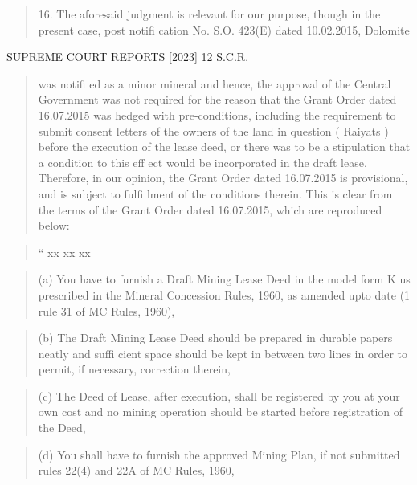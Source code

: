 \documentclass[12pt,a4paper]{article}
\newenvironment{judgequote}
  {\begin{quote}\small}
  {\end{quote}}
\begin{document}
\begin{judgequote}
16. The aforesaid judgment is relevant for our purpose, though in the
present case, post notifi cation No. S.O. 423(E) dated 10.02.2015, Dolomite
\end{judgequote}



 SUPREME COURT REPORTS [2023] 12 S.C.R.


\begin{judgequote}
was notifi ed as a minor mineral and hence, the approval of the Central
Government was not required for the reason that the Grant Order dated
16.07.2015 was hedged with pre-conditions, including the requirement
to submit consent letters of the owners of the land in question ( Raiyats )
before the execution of the lease deed, or there was to be a stipulation that a
condition to this eff ect would be incorporated in the draft lease. Therefore, in
our opinion, the Grant Order dated 16.07.2015 is provisional, and is subject
to fulfi lment of the conditions therein. This is clear from the terms of the
Grant Order dated 16.07.2015, which are reproduced below:
\end{judgequote}

\begin{judgequote}
``
xx xx xx
\end{judgequote}

\begin{judgequote}
(a) You have to furnish a Draft Mining Lease Deed in the model form
K us prescribed in the Mineral Concession Rules, 1960, as amended
upto date (1 rule 31 of MC Rules, 1960),
\end{judgequote}

\begin{judgequote}
(b) The Draft Mining Lease Deed should be prepared in durable papers
neatly and suffi cient space should be kept in between two lines in order
to permit, if necessary, correction therein,
\end{judgequote}

\begin{judgequote}
(c) The Deed of Lease, after execution, shall be registered by you
at your own cost and no mining operation should be started before
registration of the Deed,
\end{judgequote}

\begin{judgequote}
(d) You shall have to furnish the approved Mining Plan, if not submitted
rules 22(4) and 22A of MC Rules, 1960,
\end{judgequote}
\end{document}
